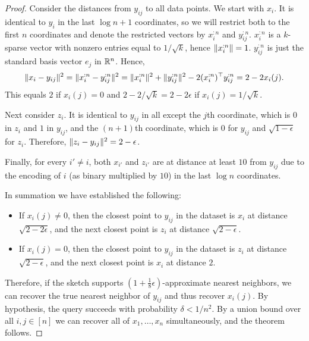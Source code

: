 \begin{proof}
Consider the distances from $y_{ij}$ to all data points. We start with $x_i$. It is identical to $y_i$ in the last $\log n+1$ coordinates, so we will restrict both to the first $n$ coordinates and denote the restricted vectors by $x_i^{:n}$ and $y_{ij}^{:n}$. $x_i^{:n}$ is a $k$-sparse vector with nonzero entries equal to $1/\sqrt{k}$, hence $\lVert x_i^{:n}\rVert=1$. $y_{ij}^{:n}$ is just the standard basis vector $e_j$ in $\mathbb R^n$. Hence,
\[
  \lVert x_i-y_{ij}\rVert^2 =
  \lVert x_i^{:n}-y_{ij}^{:n}\rVert^2 =
  \lVert x_i^{:n}\rVert^2 + \lVert y_{ij}^{:n}\rVert^2 - 2(x_i^{:n})^\top y_{ij}^{:n} =
  2-2x_i(j).
\]
This equals $2$ if $x_i(j)=0$ and $2-2/\sqrt k=2-2\epsilon$ if $x_i(j)=1/\sqrt k$.

Next consider $z_i$. It is identical to $y_{ij}$ in all except the $j$th coordinate, which is $0$ in $z_i$ and $1$ in $y_{ij}$, and the $(n+1)$th coordinate, which is $0$ for $y_{ij}$ and $\sqrt{1-\epsilon}$ for $z_i$. Therefore, $\lVert z_i-y_{ij}\rVert^2=2-\epsilon$.

Finally, for every $i'\neq i$, both $x_{i'}$ and $z_{i'}$ are at distance at least $10$ from $y_{ij}$ due to the encoding of $i$ (as binary multiplied by $10$) in the last $\log n$ coordinates.

In summation we have established the following:
\begin{itemize}
  \item If $x_i(j)\neq0$, then the closest point to $y_{ij}$ in the dataset is $x_i$ at distance $\sqrt{2-2\epsilon}$, and the next closest point is $z_i$ at distance $\sqrt{2-\epsilon}$.
  \item If $x_i(j)=0$, then the closest point to $y_{ij}$ in the dataset is $z_i$ at distance $\sqrt{2-\epsilon}$, and the next closest point is $x_i$ at distance $2$.
\end{itemize}
Therefore, if the sketch supports $(1+\frac{1}{8}\epsilon)$-approximate nearest neighbors, we can recover the true nearest neighbor of $y_{ij}$ and thus recover $x_i(j)$. By hypothesis, the query succeeds with probability $\delta<1/n^2$.
By a union bound over all $i,j\in[n]$ we can recover all of $x_1,\ldots,x_n$ simultaneously, and the theorem follows.
\end{proof}